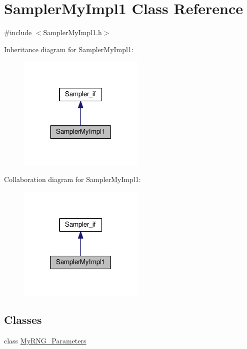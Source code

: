 \hypertarget{class_sampler_my_impl1}{\section{Sampler\-My\-Impl1 Class Reference}
\label{class_sampler_my_impl1}
}


{\ttfamily \#include $<$Sampler\-My\-Impl1.\-h$>$}



Inheritance diagram for Sampler\-My\-Impl1\-:
\nopagebreak
\begin{figure}[H]
\begin{center}
\leavevmode
\includegraphics[width=170pt]{class_sampler_my_impl1__inherit__graph}
\end{center}
\end{figure}


Collaboration diagram for Sampler\-My\-Impl1\-:
\nopagebreak
\begin{figure}[H]
\begin{center}
\leavevmode
\includegraphics[width=170pt]{class_sampler_my_impl1__coll__graph}
\end{center}
\end{figure}
\subsection*{Classes}
\begin{DoxyCompactItemize}
\item 
class \hyperlink{class_sampler_my_impl1_1_1_my_r_n_g___parameters}{My\-R\-N\-G\-\_\-\-Parameters}
\end{DoxyCompactItemize}
